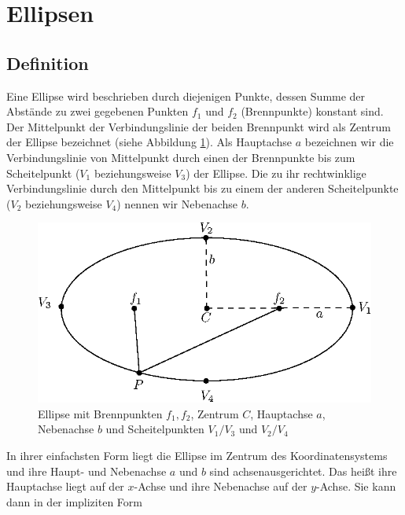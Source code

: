 \section{Ellipsen}
\label{s:ellipse}
\subsection{Definition}
\label{s:ellipseGeneral}

\begin{definition}[Ellipse]
	Eine Ellipse wird beschrieben durch diejenigen Punkte, dessen Summe der Abstände zu zwei gegebenen Punkten $f_1$ und $f_2$ (Brennpunkte) konstant sind. Der Mittelpunkt der Verbindungslinie der beiden Brennpunkt wird als Zentrum der Ellipse bezeichnet (siehe Abbildung \ref{fig:ellipseDef}). 
	Als Hauptachse $a$ bezeichnen wir die Verbindungslinie von Mittelpunkt durch einen der Brennpunkte bis zum Scheitelpunkt ($V_1$ beziehungsweise $V_3$) der Ellipse. Die zu ihr rechtwinklige Verbindungslinie durch den Mittelpunkt bis zu einem der anderen Scheitelpunkte ($V_2$ beziehungsweise $V_4$) nennen wir Nebenachse $b$.
\end{definition}

\begin{figure}[!htb]
	\centering
	\includegraphics[scale=.9]{images/ellipse_focalDef.eps}
	\caption{Ellipse mit Brennpunkten $f_1, f_2$, Zentrum $C$, Hauptachse $a$, Nebenachse $b$ und Scheitelpunkten $V_1/V_3$ und $V_2/V_4$}
	\label{fig:ellipseDef}
\end{figure}

In ihrer einfachsten Form liegt die Ellipse im Zentrum des Koordinatensystems und ihre Haupt- und Nebenachse $a$ und $b$ sind achsenausgerichtet. Das heißt ihre Hauptachse liegt auf der $x$-Achse und ihre Nebenachse auf der $y$-Achse. Sie kann dann in der impliziten Form

